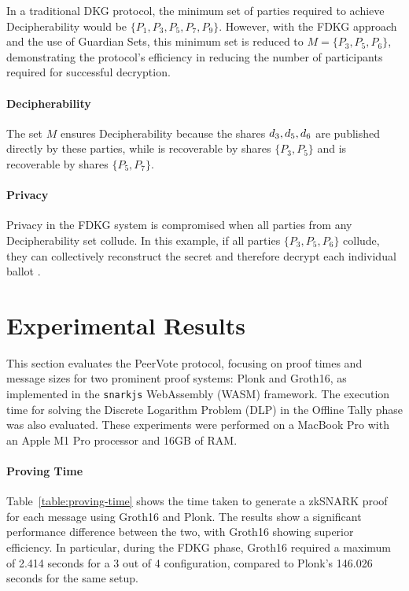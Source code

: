 \documentclass[runningheads]{llncs}
\begin{document}
In a traditional DKG protocol, the minimum set of parties required to achieve Decipherability would be \(\{P_1, P_3, P_5, P_7, P_9 \}\). However, with the FDKG approach and the use of Guardian Sets, this minimum set is reduced to \(M = \{P_3, P_5, P_6\}\), demonstrating the protocol's efficiency in reducing the number of participants required for successful decryption.

\paragraph{Decipherability}
The set $M$ ensures Decipherability because the shares $d_{3},d_{5},d_{6}$ are published directly by these parties, while  is recoverable by shares \(\{P_3, P_5\}\) and  is recoverable by shares \(\{P_5, P_7\}\).

\paragraph{Privacy}
Privacy in the FDKG system is compromised when all parties from any Decipherability set collude. In this example, if all parties \(\{P_3, P_5, P_6\}\) collude, they can collectively reconstruct the secret \DecryptionKey{} and therefore decrypt each individual ballot .



\section{Experimental Results}

This section evaluates the PeerVote protocol, focusing on proof times and message sizes for two prominent proof systems: Plonk and Groth16, as implemented in the \texttt{snarkjs} WebAssembly (WASM) framework. The execution time for solving the Discrete Logarithm Problem (DLP) in the Offline Tally phase was also evaluated. These experiments were performed on a MacBook Pro with an Apple M1 Pro processor and 16GB of RAM.

\paragraph{Proving Time}

Table~\ref{table:proving-time} shows the time taken to generate a zkSNARK proof for each message using Groth16 and Plonk. The results show a significant performance difference between the two, with Groth16 showing superior efficiency. In particular, during the FDKG phase, Groth16 required a maximum of 2.414 seconds for a 3 out of 4 configuration, compared to Plonk's 146.026 seconds for the same setup.
\end{document}

